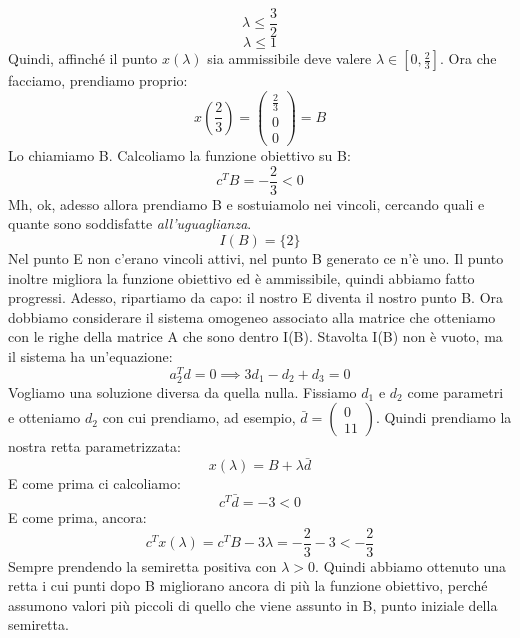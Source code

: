 \begin{equation*}
    \lambda \leq \frac{3}{2}
\end{equation*}
\begin{equation*}
    \lambda \leq 1
\end{equation*}
Quindi, affinché il punto $x(\lambda)$ sia ammissibile deve valere $\lambda \in [0,\frac{2}{3}]$. Ora che facciamo, prendiamo proprio:
\begin{equation*}
    x(\frac{2}{3}) = \begin{pmatrix}
        \frac{2}{3}\\
        0\\
        0
    \end{pmatrix} = B
\end{equation*}
Lo chiamiamo B. Calcoliamo la funzione obiettivo su B:
\begin{equation*}
    c^TB = -\frac{2}{3} < 0
\end{equation*}
Mh, ok, adesso allora prendiamo B e sostuiamolo nei vincoli, cercando quali e quante sono soddisfatte \textit{all'uguaglianza}.
\begin{equation*}
    I(B) = \{2\}
\end{equation*}
Nel punto E non c'erano vincoli attivi, nel punto B generato ce n'è uno. Il punto inoltre migliora la funzione obiettivo ed è ammissibile, quindi abbiamo fatto progressi. Adesso, ripartiamo da capo: il nostro E diventa il nostro punto B. Ora dobbiamo considerare il sistema omogeneo associato alla matrice che otteniamo con le righe della matrice A che sono dentro I(B). Stavolta I(B) non è vuoto, ma il sistema ha un'equazione:
\begin{equation*}
    a_2^Td = 0 \implies 3d_1 - d_2 + d_3 = 0
\end{equation*}
Vogliamo una soluzione diversa da quella nulla. Fissiamo $d_1$ e $d_2$ come parametri e otteniamo $d_2$ con cui prendiamo, ad esempio, $\bar{d} = \begin{pmatrix}
    0\\
    1
    1
\end{pmatrix}$. Quindi prendiamo la nostra retta parametrizzata:
\begin{equation*}
    x(\lambda) = B + \lambda \bar{d}
\end{equation*}
E come prima ci calcoliamo:
\begin{equation*}
    c^T\bar{d} = -3 < 0
\end{equation*}
E come prima, ancora:
\begin{equation*}
    c^Tx(\lambda) = c^TB - 3\lambda = -\frac{2}{3} - 3 < - \frac{2}{3}
\end{equation*}
Sempre prendendo la semiretta positiva con $\lambda > 0$. Quindi abbiamo ottenuto una retta i cui punti dopo B migliorano ancora di più la funzione obiettivo, perché assumono valori più piccoli di quello che viene assunto in B, punto iniziale della semiretta.



